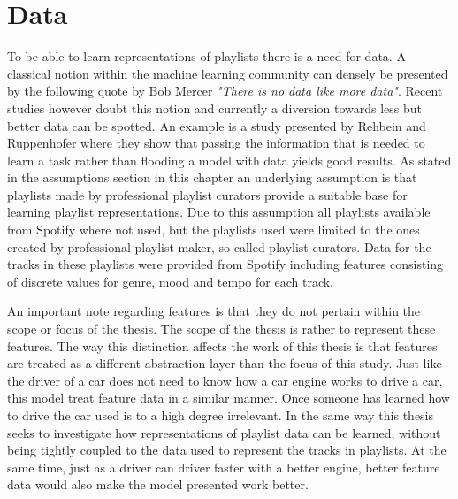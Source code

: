 \documentclass[a4paper,11pt]{kth-mag}
\begin{document}
\section{Data}
To be able to learn representations of playlists there is a need for data. A classical notion within the machine learning community can densely be presented by the following quote by Bob Mercer \textit{"There is no data like more data"}\cite{bertin2011million}. Recent studies however doubt this notion and currently a diversion towards less but better data can be spotted. An example is a study presented by Rehbein and Ruppenhofer where they show that passing the information that is needed to learn a task rather than flooding a model with data yields good results\cite{rehbein2010there}. As stated in the assumptions section in this chapter an underlying assumption is that playlists made by professional playlist curators provide a suitable base for learning playlist representations. Due to this assumption all playlists available from Spotify where not used, but the playlists used were limited to the ones created by professional playlist maker, so called playlist curators. Data for the tracks in these playlists were provided from Spotify including features consisting of discrete values for genre, mood and tempo for each track.

An important note regarding features is that they do not pertain within the scope or focus of the thesis. The scope of the thesis is rather to represent these features. The way this distinction affects the work of this thesis is that features are treated as a different abstraction layer than the focus of this study. Just like the driver of a car does not need to know how a car engine works to drive a car, this model treat feature data in a similar manner. Once someone has learned how to drive the car used is to a high degree irrelevant. In the same way this thesis seeks to investigate how representations of playlist data can be learned, without being tightly coupled to the data used to represent the tracks in playlists. At the same time, just as a driver can driver faster with a better engine, better feature data would also make the model presented work better.
\end{document}
